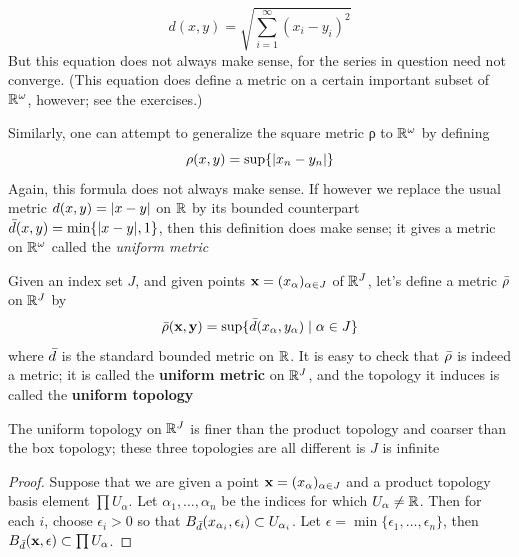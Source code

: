 \documentclass[11pt]{article}
\begin{document}
\begin{equation*}
d(x,y)=\sqrt{\sum_{i=1}^\infty(x_i-y_i)^2}
\end{equation*}
But this equation does not always make sense, for the series in question need not converge. (This
equation does define a metric on a certain important subset of \(\mathbb{R}^\omega\), however; see the
exercises.)

Similarly, one can attempt to generalize the square metric ρ to \(\mathbb{R}^\omega\) by defining
\begin{equation*}
\rho(x,y)=\sup\{\abs{x_n-y_n}\}
\end{equation*}
Again, this formula does not always make sense. If however we replace the usual
metric \(d(x,y)=\abs{x-y}\) on \(\mathbb{R}\) by its bounded counterpart \(\bard(x,y)=\min\{\abs{x-y},1\}\), then
this definition does make sense; it gives a metric on \(\mathbb{R}^\omega\) called the \emph{uniform metric}

\begin{definition}[]
Given an index set \(J\), and given points \(\operatorname{\textbf{x}}=(x_\alpha)_{\alpha\in J}\) of \(\mathbb{R}^J\), let's define a
metric \(\bar{\rho}\) on \(\mathbb{R}^J\) by
\begin{equation*}
\bar{\rho}(\operatorname{\textbf{x}},\operatorname{\textbf{y}})=\sup\{\bar{d}(x_\alpha,y_\alpha)\mid\alpha\in J\}
\end{equation*}
where \(\bar{d}\) is the standard bounded metric on \(\mathbb{R}\). It is easy to check that \(\bar{\rho}\) is
indeed a metric; it is called the \textbf{uniform metric} on \(\mathbb{R}^J\), and the topology it induces is called
the \textbf{uniform topology}
\end{definition}

\begin{theorem}[]
The uniform topology on \(\mathbb{R}^J\) is finer than the product topology and coarser than the box
topology; these three topologies are all different is \(J\) is infinite
\end{theorem}

\begin{proof}
Suppose that we are given a point \(\operatorname{\textbf{x}}=(x_\alpha)_{\alpha\in J}\) and a product topology basis
element \(\prod U_\alpha\). Let \(\alpha_1,\dots,\alpha_n\) be the indices for which \(U_\alpha\neq\mathbb{R}\). Then for each \(i\),
choose \(\epsilon_i>0\) so that \(B_{\bar{d}}(x_{\alpha_i},\epsilon_i)\subset U_{\alpha_i}\). Let \(\epsilon=\min\{\epsilon_1,\dots,\epsilon_n\}\), then
\(B_{\bar{d}}(\operatorname{\textbf{x}},\epsilon)\subset\prod U_\alpha\).
\end{proof}
\end{document}
